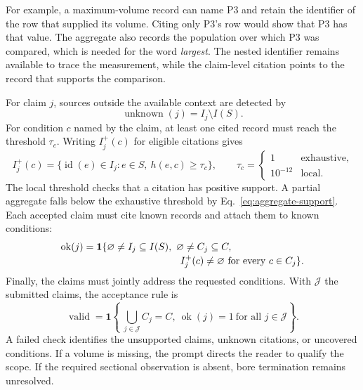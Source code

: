 For example, a maximum-volume record can name P3 and retain the identifier of the row that supplied its volume. Citing only P3's row would show that P3 has that value. The aggregate also records the population over which P3 was compared, which is needed for the word \emph{largest}. The nested identifier remains available to trace the measurement, while the claim-level citation points to the record that supports the comparison.

For claim $j$, sources outside the available context are detected by
\begin{equation}
 \operatorname{unknown}(j)=I_j\setminus I(S).
\end{equation}
For condition $c$ named by the claim, at least one cited record must reach the threshold $\tau_c$. Writing $I_j^+(c)$ for eligible citations gives
\begin{equation}
 I_j^+(c)=\{\operatorname{id}(e)\in I_j:e\in S,\ h(e,c)\ge\tau_c\},
 \qquad
 \tau_c=\begin{cases}1&\text{exhaustive},\\10^{-12}&\text{local}.\end{cases}
\end{equation}
The local threshold checks that a citation has positive support. A partial aggregate falls below the exhaustive threshold by Eq.~\eqref{eq:aggregate-support}. Each accepted claim must cite known records and attach them to known conditions:
\begin{equation}
 \begin{aligned}
 \operatorname{ok}(j)={}&
 \mathbf1\{\varnothing\ne I_j\subseteq I(S),\
             \varnothing\ne C_j\subseteq C,\\[-2pt]
 &\hspace{30mm} I_j^+(c)\ne\varnothing\ \text{for every }c\in C_j\}.
 \end{aligned}
\end{equation}
Finally, the claims must jointly address the requested conditions. With $\mathcal J$ the submitted claims, the acceptance rule is
\begin{equation}
 \operatorname{valid}=
 \mathbf1\!\left\{\ \bigcup_{j\in\mathcal J} C_j=C,\
                   \operatorname{ok}(j)=1\ \text{for all }j\in\mathcal J\right\}.
\end{equation}
A failed check identifies the unsupported claims, unknown citations, or uncovered conditions. If a volume is missing, the prompt directs the reader to qualify the scope. If the required sectional observation is absent, bore termination remains unresolved.

